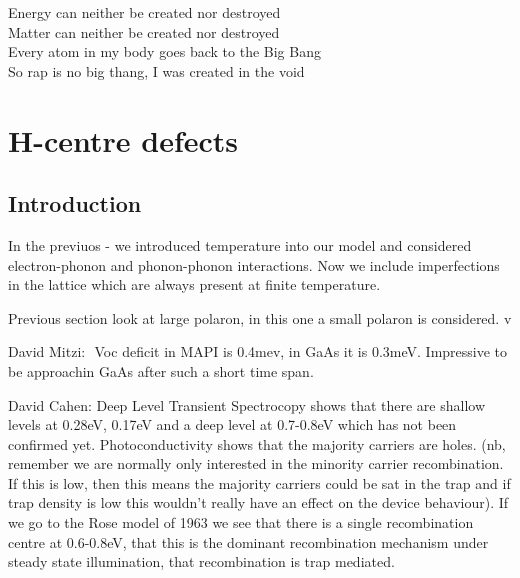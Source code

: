 \begin{savequote}[8cm]
Energy can neither be created nor destroyed \\
Matter can neither be created nor destroyed \\
Every atom in my body goes back to the Big Bang \\
So rap is no big thang, I was created in the void
\end{savequote}

\chapter{\label{ch:6-defects}H-centre defects}

\section{Introduction}
In the previuos - we introduced temperature into our model and considered electron-phonon and phonon-phonon interactions. Now we include imperfections in the lattice which are always present at finite temperature.

Previous section look at large polaron, in this one a small polaron is considered.
 v

David Mitzi: 
Voc deficit in MAPI is 0.4mev, in GaAs it is 0.3meV. Impressive to be approachin GaAs after such a short time span.


David Cahen: Deep Level Transient Spectrocopy shows that there are shallow levels at 0.28eV, 0.17eV and a deep level at 0.7-0.8eV which has not been confirmed yet.
Photoconductivity shows that the majority carriers are holes. (nb, remember we are normally only interested in the minority carrier recombination. If this is low, then this means the majority carriers could be sat in the trap and if trap density is low this wouldn’t really have an effect on the device behaviour).
If we go to the Rose model of 1963 we see that there is a single recombination centre at 0.6-0.8eV, that this is the dominant recombination mechanism under steady state illumination, that recombination is trap mediated. 

